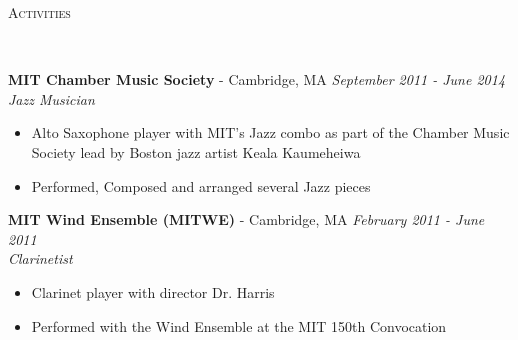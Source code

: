 \documentclass{article}
\newenvironment{changemargin}[2]{%
  \begin{list}{}{%
    \setlength{\topsep}{0pt}%
    \setlength{\leftmargin}{#1}%
    \setlength{\rightmargin}{#2}%
    \setlength{\listparindent}{\parindent}%
    \setlength{\itemindent}{\parindent}%
    \setlength{\parsep}{\parskip}%
  }%
  \item[]}{\end{list}
}
\newcommand{\lineover}{
	\begin{changemargin}{-0.05in}{-0.05in}
		\vspace*{-8pt}
		\hrulefill \\
		\vspace*{-2pt}
	\end{changemargin}
}
\newcommand{\header}[1]{
	\begin{changemargin}{-0.5in}{-0.5in}
		\scshape{#1}\\
  	\lineover
	\end{changemargin}
}
\newenvironment{body} {
	\vspace*{-16pt}
	\begin{changemargin}{-0.25in}{-0.5in}
  }	
	{\end{changemargin}
}
\begin{document}
\newpage

\header{Activities}

\begin{body}
	\vspace{16pt}
    \textbf{MIT Chamber Music Society} - Cambridge, MA \hfill \emph{September 2011 - June 2014}\\
	\emph{Jazz Musician}\\
	\vspace*{-3pt}
	\begin{itemize} \itemsep -2pt  %
    	\item Alto Saxophone player with MIT's Jazz combo as part of the Chamber Music Society lead by Boston jazz artist 
		Keala Kaumeheiwa
        \item Performed, Composed and arranged several Jazz pieces
	\end{itemize}
	\vspace{5 pt}
    
    \textbf{MIT Wind Ensemble (MITWE)} - Cambridge, MA \hfill \emph{February 2011 - June 2011}\\
	\emph{Clarinetist}\\
	\vspace*{-3pt}
	\begin{itemize} \itemsep -2pt  %
    	\item Clarinet player with director Dr. Harris
        \item Performed with the Wind Ensemble at the MIT 150th Convocation 
	\end{itemize}
	\vspace{5 pt}
    
\end{body}


	

    
    
    
\end{document}
